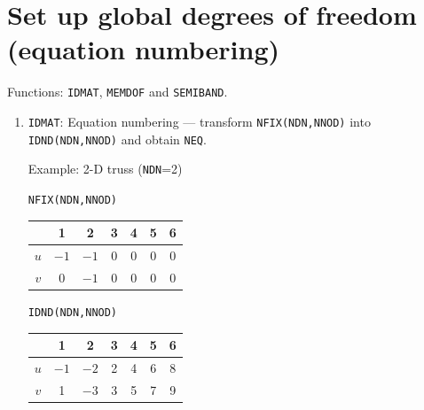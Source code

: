 \section{Set up global degrees of freedom (equation numbering)}
Functions: \texttt{IDMAT}, \texttt{MEMDOF} and \texttt{SEMIBAND}.
\begin{enumerate}[leftmargin=*]
  \item \texttt{IDMAT}: Equation numbering --- transform \texttt{NFIX(NDN,NNOD)} into \texttt{IDND(NDN,NNOD)} and obtain \texttt{NEQ}.

    Example: 2-D truss (\texttt{NDN}=2)
    \begin{fig}
      
    \end{fig}
    \begin{center}
      \begin{minipage}{0.47\linewidth}\centering
        \texttt{NFIX(NDN,NNOD)}\\[4pt]
        \begin{tabular}{|c|c|c|c|c|c|c|}\hline
              & 1    & 2    & 3 & 4 & 5 & 6\\\hline
          $u$ & $-1$ & $-1$ & 0 & 0 & 0 & 0\\\hline
          $v$ & 0    & $-1$ & 0 & 0 & 0 & 0\\\hline
        \end{tabular}
      \end{minipage}
      \begin{minipage}{0.47\linewidth}\centering
        \texttt{IDND(NDN,NNOD)}\\[4pt]
        \begin{tabular}{|c|c|c|c|c|c|c|}\hline
              & 1    & 2    & 3 & 4 & 5 & 6\\\hline
          $u$ & $-1$ & $-2$ & 2 & 4 & 6 & 8\\\hline
          $v$ & 1    & $-3$ & 3 & 5 & 7 & 9\\\hline
        \end{tabular}
      \end{minipage}
    \end{center}


\end{enumerate}
